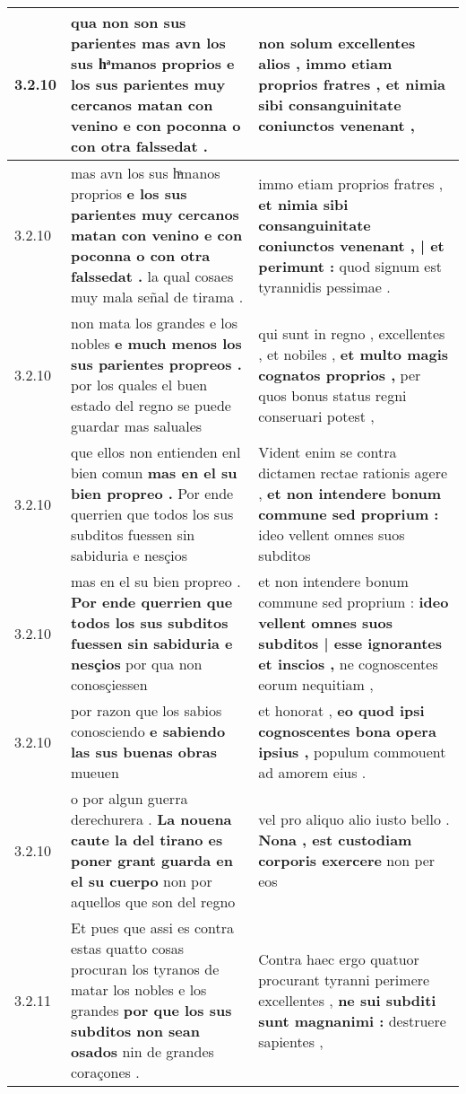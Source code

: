\begin{tabular}{|p{1cm}|p{6.5cm}|p{6.5cm}|}
3.2.10 & qua non son sus parientes \textbf{ mas avn los sus hͣmanos proprios } e los sus parientes muy cercanos matan con venino e con poconna o con otra falssedat . & non solum excellentes alios , \textbf{ immo etiam proprios fratres , } et nimia sibi consanguinitate coniunctos venenant , \\\hline
3.2.10 & mas avn los sus hͣmanos proprios \textbf{ e los sus parientes muy cercanos matan con venino e con poconna o con otra falssedat . } la qual cosaes muy mala señal de tirama . & immo etiam proprios fratres , \textbf{ et nimia sibi consanguinitate coniunctos venenant , | et perimunt : } quod signum est tyrannidis pessimae . \\\hline
3.2.10 & non mata los grandes e los nobles \textbf{ e much menos los sus parientes propreos . } por los quales el buen estado del regno se puede guardar mas saluales & qui sunt in regno , excellentes , et nobiles , \textbf{ et multo magis cognatos proprios , } per quos bonus status regni conseruari potest , \\\hline
3.2.10 & que ellos non entienden enl bien comun \textbf{ mas en el su bien propreo . } Por ende querrien que todos los sus subditos fuessen sin sabiduria e nesçios & Vident enim se contra dictamen rectae rationis agere , \textbf{ et non intendere bonum commune sed proprium : } ideo vellent omnes suos subditos \\\hline
3.2.10 & mas en el su bien propreo . \textbf{ Por ende querrien que todos los sus subditos fuessen sin sabiduria e nesçios } por qua non conosçiessen & et non intendere bonum commune sed proprium : \textbf{ ideo vellent omnes suos subditos | esse ignorantes et inscios , } ne cognoscentes eorum nequitiam , \\\hline
3.2.10 & por razon que los sabios conosciendo \textbf{ e sabiendo las sus buenas obras } mueuen & et honorat , \textbf{ eo quod ipsi cognoscentes bona opera ipsius , } populum commouent ad amorem eius . \\\hline
3.2.10 & o por algun guerra derechurera . \textbf{ La nouena caute la del tirano es poner grant guarda en el su cuerpo } non por aquellos que son del regno & vel pro aliquo alio iusto bello . \textbf{ Nona , est custodiam corporis exercere } non per eos \\\hline
3.2.11 & Et pues que assi es contra estas quatto cosas procuran los tyranos de matar los nobles e los grandes \textbf{ por que los sus subditos non sean osados } nin de grandes coraçones . & Contra haec ergo quatuor procurant tyranni perimere excellentes , \textbf{ ne sui subditi sunt magnanimi : } destruere sapientes , \\\hline

\end{tabular}
